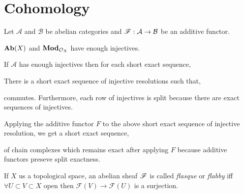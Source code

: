 \documentclass[12pt]{article}
\begin{document}
\section{Cohomology}

Let $\mathcal{A}$ and $\mathcal{B}$ be abelian categories and $\mathscr{F} : \mathcal{A} \to \mathcal{B}$ be an additive functor. 

\begin{theorem}
$\mathbf{Ab}(X)$ and $\mathbf{Mod}_{\mathcal{O}_{X}}$ have enough injectives. 
\end{theorem}

\begin{lemma}
If $\mathcal{A}$ has enough injectives then for each short exact sequence,
\begin{center}
\end{center}
There is a short exact sequence of injective resolutions such that,
\begin{center}
\end{center}
commutes. Furthermore, each row of injectives is split because there are exact sequences of injectives. 
\end{lemma}

\begin{corollary}
Applying the additive functor $F$ to the above short exact sequence of injective resolution, we get a short exact sequence,
\begin{center}
\end{center} 
of chain complexes which remains exact after applying $F$ because additive functors preseve split exactness. 
\end{corollary}

\begin{definition}
If $X$ us a topological space, an abelian sheaf $\mathscr{F}$ is called \textit{flasque} or \textit{flabby} iff $\forall U \subset V \subset X$ open then  $\mathcal{F}(V) \to \mathcal{F}(U)$ is a surjection. 
\end{definition}
\end{document}
